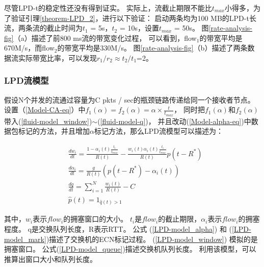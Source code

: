 尽管LPD-t的稳定性还没有得到证实。
实际上，流截止期限不能比$t_{max}$小得多，为了验证引理\ref{theorem-LPD_2}，进行以下验证： 
启动两条均为100 MB的LPD-t长流，两条流的截止时间为$t_1$ = 5s，$t_2$ = 10s，设置$t_{max}$ = 50s。 
图\ref{rate-analysis-fig}（a）描述了前800 ms流的带宽变化过程，
可以看到，flow$_1$的带宽平均是670M/s，而flow$_2$的带宽平均是330M/s。
图\ref{rate-analysis-fig}（b）描述了两条数据流实际带宽比率，可以发现$r_1/r_2 \approx t_2 / t_1$=2。


\subsubsection{LPD流模型}
假设N个并发的流通过容量为C pkts / sec的瓶颈链路传递给同一个接收者节点。
设置（\ref{Model-CA-eq}）中$f_1(\alpha)=f_2(\alpha)=\alpha \times \frac{t}{t_{max}}$，
同时把$f_1(\alpha)$和$f_2(\alpha)$带入(\ref{fluid-model_window})$\sim$(\ref{fluid-model-q})，
并且改动(\ref{Model-alpha-eq})中数据包标记的方法，并且增加$\alpha$标记方法，那么LPD流模型可以描述为：


 \begin{align}
&\frac{dw_i}{dt}=\frac{1-\alpha_i(t)\frac{t_i}{t_{max}}}{R(t)}-\frac{w_i(t)\alpha_i(t)\frac{t_i}{t_{max}}}{R(t)}p(t-R^*)  \label{LPD-model_window} \\
&\frac{d\alpha_i}{dt}=\frac{g}{R(t)}(p(t-R^*)-\alpha_i(t)) \label{LPD-model_alpha} \\
&\frac{dq}{dt}= \sum_{i=1}^N{\frac{w_i(t)}{R(t)}}-C \label{LPD-model_queue}  \\
&\widehat{p}(t)=1_{\widehat{q}(t)>1}  \label{LPD-model_mark}
\end{align}



其中，$w_i$表示$flow_i$的拥塞窗口的大小。 
$t_i$是$flow_i$的截止期限，$\alpha_i$表示$flow_i$的拥塞程度。 
q是交换队列长度，R表示RTT。
公式 (\ref{LPD-model_alpha}) 和 (\ref{LPD-model_mark})描述了交换机的ECN标记过程。
(\ref{LPD-model_window}) 模拟的是拥塞窗口。
公式(\ref{LPD-model_queue})描述交换机队列长度。
利用该模型，可以推算出窗口大小和队列长度。

